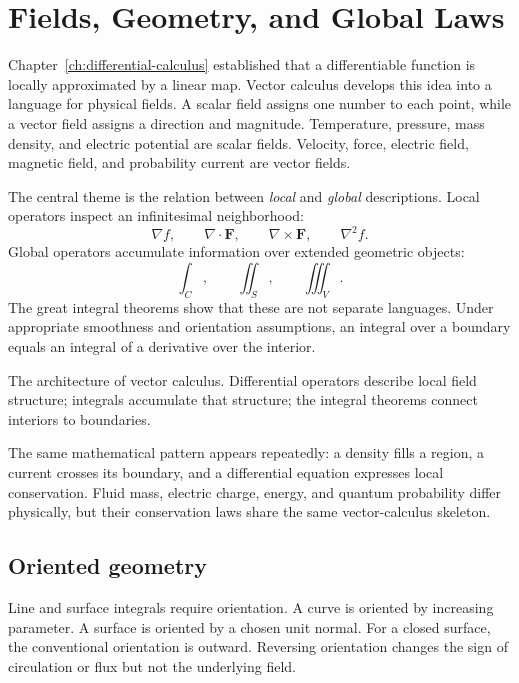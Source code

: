\section{Fields, Geometry, and Global Laws}
\label{sec:fields-global-laws}

Chapter~\ref{ch:differential-calculus} established that a differentiable function is locally approximated by a linear map. Vector calculus develops this idea into a language for physical fields. A scalar field assigns one number to each point, while a vector field assigns a direction and magnitude. Temperature, pressure, mass density, and electric potential are scalar fields. Velocity, force, electric field, magnetic field, and probability current are vector fields.

The central theme is the relation between \emph{local} and \emph{global} descriptions. Local operators inspect an infinitesimal neighborhood:
\[
\nabla f,\qquad \nabla\cdot\mathbf F,\qquad \nabla\times\mathbf F,\qquad \nabla^2 f.
\]
Global operators accumulate information over extended geometric objects:
\[
\int_C,\qquad \iint_S,\qquad \iiint_V.
\]
The great integral theorems show that these are not separate languages. Under appropriate smoothness and orientation assumptions, an integral over a boundary equals an integral of a derivative over the interior.

\begin{bookfigure}{The architecture of vector calculus. Differential operators describe local field structure; integrals accumulate that structure; the integral theorems connect interiors to boundaries.}

\label{fig:vector-calculus-architecture}
\end{bookfigure}

\begin{keyidea}
The same mathematical pattern appears repeatedly: a density fills a region, a current crosses its boundary, and a differential equation expresses local conservation. Fluid mass, electric charge, energy, and quantum probability differ physically, but their conservation laws share the same vector-calculus skeleton.
\end{keyidea}

\subsection{Oriented geometry}

Line and surface integrals require orientation. A curve is oriented by increasing parameter. A surface is oriented by a chosen unit normal. For a closed surface, the conventional orientation is outward. Reversing orientation changes the sign of circulation or flux but not the underlying field.

